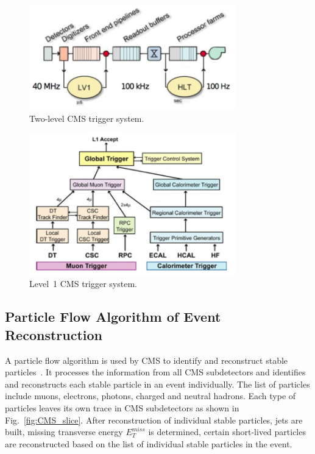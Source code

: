 \begin{figure}[htb]
  \begin{center}
    \includegraphics[width=0.8\textwidth]{../figs/Exp/trigger_2level.png}
    \caption{Two-level CMS trigger system.}
    \label{fig:trigger_2level}
  \end{center}
\end{figure}

\begin{figure}[htb]
  \begin{center}
    \includegraphics[width=0.8\textwidth]{../figs/Exp/trigger_L1.png}
    \caption{Level~1 CMS trigger system.}
    \label{fig:trigger_L1}
  \end{center}
\end{figure}

\subsection{Particle Flow Algorithm of Event Reconstruction}

A particle flow algorithm is used by CMS to identify and reconstruct stable particles~\cite{ref_ParticleFlowAlg}. It processes the information from all CMS subdetectors and identifies and reconstructs each stable particle in an event individually. The list of particles include muons, electrons, photons, charged and neutral hadrons. Each type of particles leaves its own trace in CMS subdetectors as shown in Fig.~\ref{fig:CMS_slice}. After reconstruction of individual stable particles, jets are built, missing transverse energy $E_T^{miss}$ is determined, certain short-lived particles are reconstructed based on the list of individual stable particles in the event.


